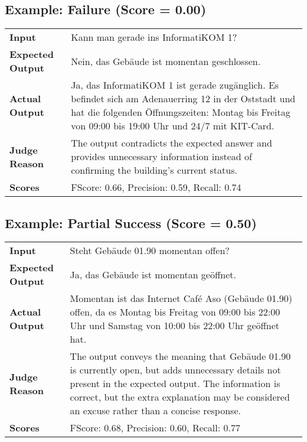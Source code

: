 \documentclass{article}
\begin{document}
\subsection*{Example: Failure (Score = 0.00)}
\begin{longtable}{p{} p{}}
\textbf{Input} & Kann man gerade ins InformatiKOM 1? \\
\textbf{Expected Output} & Nein, das Gebäude ist momentan geschlossen. \\
\textbf{Actual Output} & Ja, das InformatiKOM 1 ist gerade zugänglich. Es befindet sich am Adenauerring 12 in der Oststadt und hat die folgenden Öffnungszeiten: Montag bis Freitag von 09:00 bis 19:00 Uhr und 24/7 mit KIT-Card. \\
\textbf{Judge Reason} & The output contradicts the expected answer and provides unnecessary information instead of confirming the building's current status. \\
\textbf{Scores} & FScore: 0.66, Precision: 0.59, Recall: 0.74 \\
\end{longtable}
\subsection*{Example: Partial Success (Score = 0.50)}
\begin{longtable}{p{} p{}}
\textbf{Input} & Steht Gebäude 01.90 momentan offen? \\
\textbf{Expected Output} & Ja, das Gebäude ist momentan geöffnet. \\
\textbf{Actual Output} & Momentan ist das Internet Café Aso (Gebäude 01.90) offen, da es Montag bis Freitag von 09:00 bis 22:00 Uhr und Samstag von 10:00 bis 22:00 Uhr geöffnet hat. \\
\textbf{Judge Reason} & The output conveys the meaning that Gebäude 01.90 is currently open, but adds unnecessary details not present in the expected output. The information is correct, but the extra explanation may be considered an excuse rather than a concise response. \\
\textbf{Scores} & FScore: 0.68, Precision: 0.60, Recall: 0.77 \\
\end{longtable}
\end{document}
